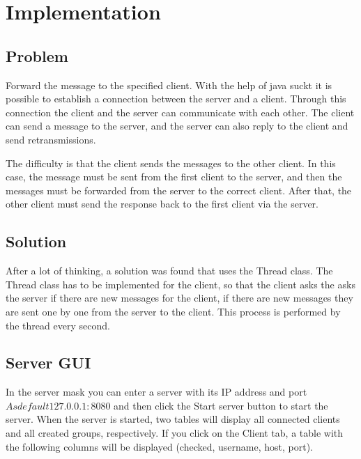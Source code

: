 \chapter{Implementation}\label{ch:implementation}


\section{Problem}\label{sec:problem}
Forward the message to the specified client.
With the help of java suckt it is possible to establish a connection between the server and
a client.
Through this connection the client and the server can communicate with each other.
The client can send a message to the server, and the server can also reply to the client and
send retransmissions.
\medskip

\noindent
The difficulty is that the client sends the messages to the other client.
In this case, the message must be sent from the first client to the server, and then the
messages must be forwarded from the server to the correct client.
After that, the other client must send the response back to the first client via the server.


\section{Solution}\label{sec:solution}
After a lot of thinking, a solution was found that uses the Thread class.
The Thread class has to be implemented for the client, so that the client asks the asks the server
if there are new messages for the client, if there are new messages they are sent one by one from
the server to the client.
This process is performed by the thread every second.


\section{Server GUI}\label{sec:server-gui}
In the server mask you can enter a server with its IP address and port \(As default 127.0.0.1:8080\)
and then click the Start server button to start the server.
When the server is started, two tables will display all connected clients and all created groups,
respectively.
If you click on the Client tab, a table with the following columns will be displayed (checked,
username, host, port).
\medskip

